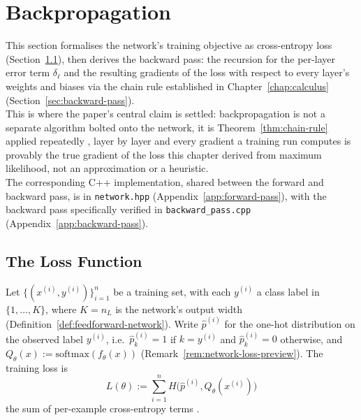\section{Backpropagation}
\label{sec:backpropagation}
	
	This section formalises the network's training objective as cross-entropy loss (Section~\ref{sec:loss-function}), then derives the backward pass: the recursion for the per-layer error term $\delta_\ell$ and the resulting gradients of the loss with respect to every layer's weights and biases via the chain rule established in Chapter~\ref{chap:calculus} (Section~\ref{sec:backward-pass}). \\
	
	This is where the paper's central claim is settled: backpropagation is not a separate algorithm bolted onto the network, it is Theorem~\ref{thm:chain-rule} applied repeatedly \citep{RumelhartHintonWilliams1986}, layer by layer and every gradient a training run computes is provably the true gradient of the loss this chapter derived from maximum likelihood, not an approximation or a heuristic. \\
	
	The corresponding C++ implementation, shared between the forward and backward pass, is in \texttt{network.hpp} (Appendix~\ref{app:forward-pass}), with the backward pass specifically verified in \texttt{backward\allowbreak\_pass.cpp} (Appendix~\ref{app:backward-pass}).
	
	\subsection{The Loss Function}
	\label{sec:loss-function}
	
		\begin{definition}
			\label{def:training-loss}
			Let $\{(x^{(i)},y^{(i)})\}_{i=1}^n$ be a training set, with each $y^{(i)}$ a class label in $\{1,\dots,K\}$, where $K=n_L$ is the network's output width (Definition~\ref{def:feedforward-network}). Write $\hat p^{(i)}$ for the one-hot distribution on the observed label $y^{(i)}$, i.e.\ $\hat p^{(i)}_k=1$ if $k=y^{(i)}$ and $\hat p^{(i)}_k=0$ otherwise, and $Q_\theta(x):=\mathrm{softmax}(f_\theta(x))$ (Remark~\ref{rem:network-loss-preview}). The training loss is
			\[
				L(\theta) := \sum_{i=1}^n H\big(\hat p^{(i)}, Q_\theta(x^{(i)})\big)
			\]
			the sum of per-example cross-entropy terms \citep{GoodfellowBengioCourville2016}.
		\end{definition}
		
